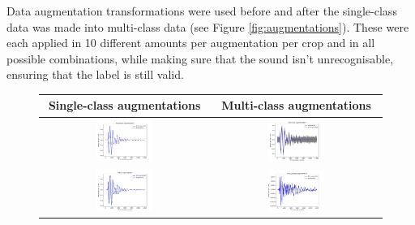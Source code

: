 \documentclass[12pt]{article}
\begin{document}
	Data augmentation transformations were used before and after the single-class data was made into multi-class data (see Figure \ref{fig:augmentations}). These were each applied in 10 different amounts per augmentation per crop and in all possible combinations, while making sure that the sound isn't unrecognisable, ensuring that the label is still valid.\medskip
	
	\begin{figure}[H]
        \centering
        \begin{tabular}{c|c}
            Single-class augmentations & Multi-class augmentations \\
            \hline
            \includegraphics[width=0.35\textwidth]{figures/amplitudeAugmentation.pdf}&
            \includegraphics[width=0.35\textwidth]{figures/addNoiseAugmentation.pdf}\\
            \includegraphics[width=0.35\textwidth]{figures/pitchAugmentation.pdf}&
            \includegraphics[width=0.35\textwidth]{figures/reduceNoiseAugmentation.pdf}\\

\end{tabular}
\end{figure}
\end{document}
